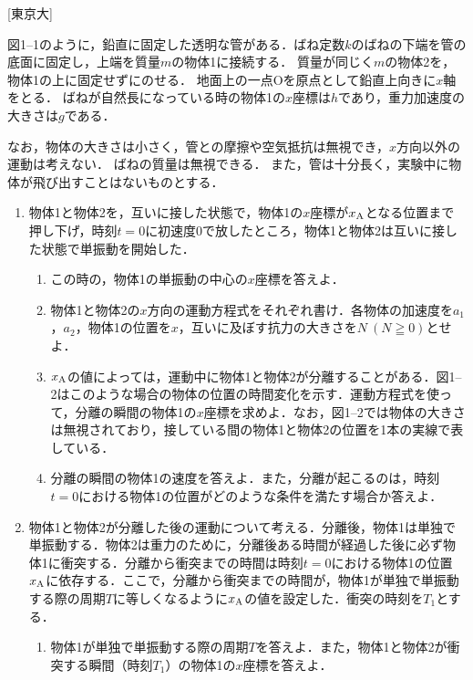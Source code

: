 

\noindent
{} [東京大]

図1--1のように，鉛直に固定した透明な管がある．ばね定数$k$のばねの下端を管の底面に固定し，上端を質量$m$の物体1に接続する．
質量が同じく$m$の物体2を，物体1の上に固定せずにのせる．
地面上の一点Oを原点として鉛直上向きに$x$軸をとる．
ばねが自然長になっている時の物体1の$x$座標は$h$であり，重力加速度の大きさは$g$である．

なお，物体の大きさは小さく，管との摩擦や空気抵抗は無視でき，$x$方向以外の運動は考えない．
ばねの質量は無視できる．
また，管は十分長く，実験中に物体が飛び出すことはないものとする．

\begin{enumerate}[I]
  \item {\hzw}物体1と物体2を，互いに接した状態で，物体1の$x$座標が$x_\mathrm{A}$となる位置まで押し下げ，時刻$t = 0$に初速度0で放したところ，物体1と物体2は互いに接した状態で単振動を開始した．
  \begin{enumerate}[(1)]
    \item {\hzw}この時の，物体1の単振動の中心の$x$座標を答えよ．
    \item {\hzw}物体1と物体2の$x$方向の運動方程式をそれぞれ書け．各物体の加速度を$a_1$，$a_2$，物体1の位置を$x$，互いに及ぼす抗力の大きさを$N \ (N \geqq 0)$とせよ．
    \item {\hzw}$x_\mathrm{A}$の値によっては，運動中に物体1と物体2が分離することがある．図1--2はこのような場合の物体の位置の時間変化を示す．運動方程式を使って，分離の瞬間の物体1の$x$座標を求めよ．なお，図1--2では物体の大きさは無視されており，接している間の物体1と物体2の位置を1本の実線で表している．
    \item {\hzw}分離の瞬間の物体1の速度を答えよ．また，分離が起こるのは，時刻$t=0$における物体1の位置がどのような条件を満たす場合か答えよ．
  \end{enumerate}
  \item {\hzw}物体1と物体2が分離した後の運動について考える．分離後，物体1は単独で単振動する．物体2は重力のために，分離後ある時間が経過した後に必ず物体1に衝突する．分離から衝突までの時間は時刻$t = 0$における物体1の位置$x_\mathrm{A}$に依存する．ここで，分離から衝突までの時間が，物体1が単独で単振動する際の周期$T$に等しくなるように$x_\mathrm{A}$の値を設定した．衝突の時刻を$T_1$とする．
  \begin{enumerate}[(1)]
    \item {\hzw}物体1が単独で単振動する際の周期$T$を答えよ．また，物体1と物体2が衝突する瞬間（時刻$T_1$）の物体1の$x$座標を答えよ．

\end{enumerate}
\end{enumerate}
